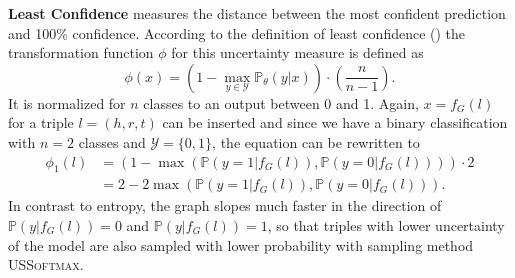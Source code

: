 \textbf{Least Confidence} 
measures the distance between the most confident prediction and 100\% confidence.
According to the definition of least confidence () the transformation function $\phi$ for this uncertainty measure is defined as
\begin{equation}
    \phi(x) = (1 - \max_{y \in \mathcal{Y}}{\mathds{P}_{\theta}(y | x)}) \cdot \left(\frac{n}{n-1}\right).
\end{equation}
It is normalized for $n$ classes to an output between 0 and 1.
Again, $x = f_G(l)$ for a triple $l = (h,r,t)$ can be inserted and since we have a binary classification with $n = 2$ classes and $\mathcal{Y} = \{0,1\}$, the equation can be rewritten to
\begin{equation} \label{eq:leastconfidence}
\begin{split}
\phi_1(l) 
& = (1 - \max({\mathds{P}(y = 1| f_G(l)), \mathds{P}(y = 0| f_G(l))})) \cdot 2 \\
&= 2 - 2 \max({\mathds{P}(y = 1| f_G(l)), \mathds{P}(y = 0| f_G(l))}).
\end{split}
\end{equation}
In contrast to entropy, the graph slopes much faster in the direction of $\mathds{P}(y | f_G(l)) = 0$ and $\mathds{P}(y | f_G(l)) = 1$, so that triples with lower uncertainty of the model are also sampled with lower probability with sampling method \textsc{USSoftmax}.
\clearpage

